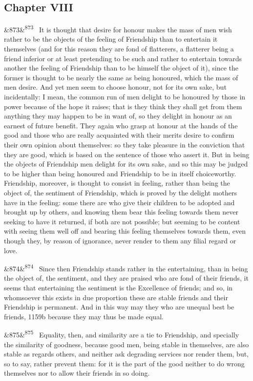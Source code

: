 \documentclass[12pt]{article}
\newcommand{\para}[1][]{\par\noindent\ifx&#1&\else\textsuperscript{\footnotesize #1}~\fi}
\begin{document}
\subsection*{Chapter VIII}

\para[873] It is thought that desire for honour makes the mass of men wish rather to be the objects of the feeling of Friendship than to entertain it themselves (and for this reason they are fond of flatterers, a flatterer being a friend inferior or at least pretending to be such and rather to entertain towards another the feeling of Friendship than to be himself the object of it), since the former is thought to be nearly the same as being honoured, which the mass of men desire. And yet men seem to choose honour, not for its own sake, but incidentally: I mean, the common run of men delight to be honoured by those in power because of the hope it raises; that is they think they shall get from them anything they may happen to be in want of, so they delight in honour as an earnest of future benefit. They again who grasp at honour at the hands of the good and those who are really acquainted with their merits desire to confirm their own opinion about themselves: so they take pleasure in the conviction that they are good, which is based on the sentence of those who assert it. But in being the objects of Friendship men delight for its own sake, and so this may be judged to be higher than being honoured and Friendship to be in itself choiceworthy. Friendship, moreover, is thought to consist in feeling, rather than being the object of, the sentiment of Friendship, which is proved by the delight mothers have in the feeling: some there are who give their children to be adopted and brought up by others, and knowing them bear this feeling towards them never seeking to have it returned, if both are not possible; but seeming to be content with seeing them well off and bearing this feeling themselves towards them, even though they, by reason of ignorance, never render to them any filial regard or love.

\para[874] Since then Friendship stands rather in the entertaining, than in being the object of, the sentiment, and they are praised who are fond of their friends, it seems that entertaining the sentiment is the Excellence of friends; and so, in whomsoever this exists in due proportion these are stable friends and their Friendship is permanent. And in this way may they who are unequal best be friends, 1159b because they may thus be made equal.

\para[875] Equality, then, and similarity are a tie to Friendship, and specially the similarity of goodness, because good men, being stable in themselves, are also stable as regards others, and neither ask degrading services nor render them, but, so to say, rather prevent them: for it is the part of the good neither to do wrong themselves nor to allow their friends in so doing.
\end{document}
